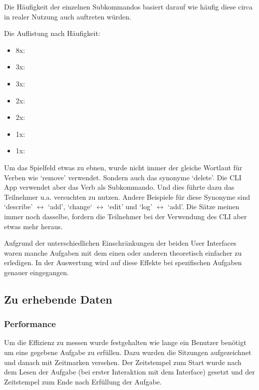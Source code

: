 \documentclass[oneside,bibliography=totocnumbered,BCOR=5mm]{scrbook}
\begin{document}
Die Häufigkeit der einzelnen Subkommandos basiert darauf wie häufig diese circa
in realer Nutzung auch auftreten würden.

Die Auflistung nach Häufigkeit:
\label{text:anzahl-aufgaben}
\begin{itemize}
  \item 8x: 
  \item 3x: 
  \item 3x: 
  \item 2x: 
  \item 2x: 
  \item 1x: 
  \item 1x: 
\end{itemize}

Um das Spielfeld etwas zu ebnen, wurde nicht immer der gleiche Wortlaut für
Verben wie `remove' verwendet. Sondern auch das synonyme `delete'. Die CLI App
verwendet aber das Verb  als Subkommando. Und dies führte
dazu das Teilnehmer u.a. versuchten  zu nutzen. Andere
Beispiele für diese Synonyme sind `describe' $\leftrightarrow$ `add', `change`
$\leftrightarrow$ `edit' und `log' $\leftrightarrow$ `add'. Die Sätze meinen
immer noch dasselbe, fordern die Teilnehmer bei der Verwendung des CLI aber
etwas mehr heraus.

Aufgrund der unterschiedlichen Einschränkungen der beiden User Interfaces waren
manche Aufgaben mit dem einen oder anderen theoretisch einfacher zu erledigen.
In der Auswertung wird auf diese Effekte bei spezifischen Aufgaben genauer
eingegangen.

\subsection{Zu erhebende Daten}

\subsubsection{Performance}

Um die Effizienz zu messen wurde festgehalten wie lange ein Benutzer benötigt
um eine gegebene Aufgabe zu erfüllen. Dazu wurden die Sitzungen aufgezeichnet
und danach mit Zeitmarken versehen. Der Zeitstempel zum Start wurde nach dem
Lesen der Aufgabe (bei erster Interaktion mit dem Interface) gesetzt und der
Zeitstempel zum Ende nach Erfüllung der Aufgabe.
\end{document}
